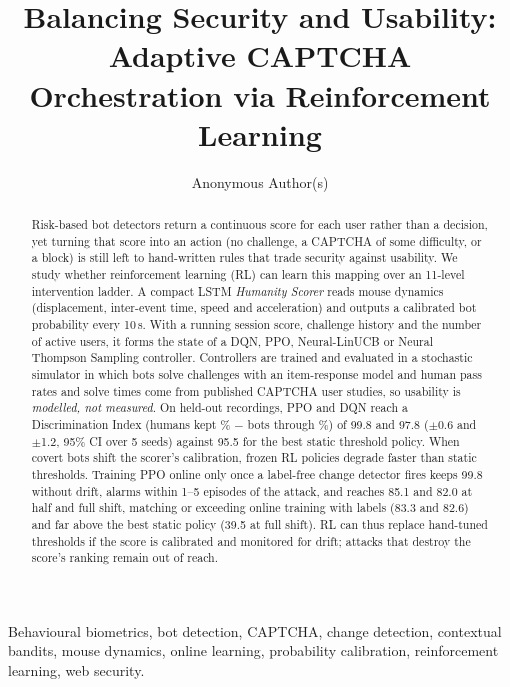 \documentclass{ieeetj}
\begin{document}

\title{Balancing Security and Usability: Adaptive CAPTCHA Orchestration via Reinforcement Learning}

\author{Anonymous Author(s)}

\begin{abstract}
Risk-based bot detectors return a continuous score for each user rather than a decision, yet turning that score into an action (no challenge, a CAPTCHA of some difficulty, or a block) is still left to hand-written rules that trade security against usability. We study whether reinforcement learning (RL) can learn this mapping over an 11-level intervention ladder. 
A compact LSTM \emph{Humanity Scorer} reads mouse dynamics (displacement, inter-event time, speed and acceleration) and outputs a calibrated bot probability every 10\,s. 
With a running session score, challenge history and the number of active users, it forms the state of a DQN, PPO, Neural-LinUCB or Neural Thompson Sampling controller. Controllers are trained and evaluated in a stochastic simulator in which bots solve challenges with an item-response model and human pass rates and solve times come from published CAPTCHA user studies, so usability is \emph{modelled, not measured}. 
On held-out recordings, PPO and DQN reach a Discrimination Index (humans kept \% $-$ bots through \%) of 99.8 and 97.8 ($\pm$0.6 and $\pm$1.2, 95\% CI over 5 seeds) against 95.5 for the best static threshold policy. 
When covert bots shift the scorer's calibration, frozen RL policies degrade faster than static thresholds. 
Training PPO online only once a label-free change detector fires keeps 99.8 without drift, alarms within 1--5 episodes of the attack, and reaches 85.1 and 82.0 at half and full shift, matching or exceeding online training with labels (83.3 and 82.6) and far above the best static policy (39.5 at full shift). RL can thus replace hand-tuned thresholds if the score is calibrated and monitored for drift; attacks that destroy the score's ranking remain out of reach.
\end{abstract}

\begin{IEEEkeywords}
Behavioural biometrics, bot detection, CAPTCHA, change detection, contextual bandits, mouse dynamics, online learning, probability calibration, reinforcement learning, web security.
\end{IEEEkeywords}
\end{document}
